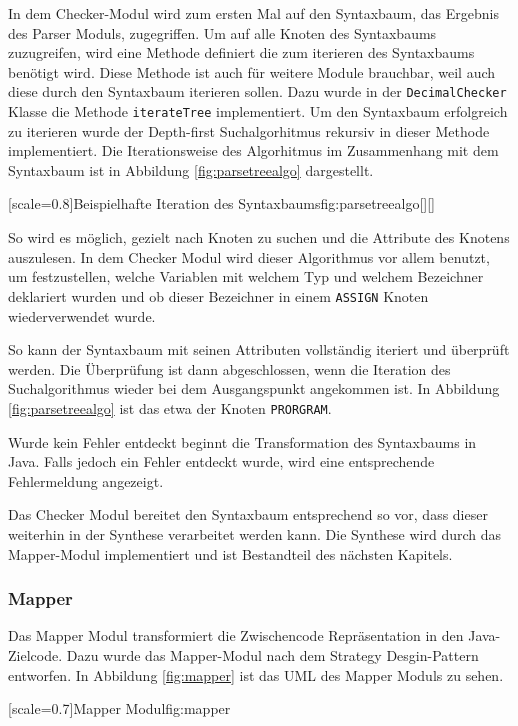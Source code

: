In dem Checker-Modul wird zum ersten Mal auf den Syntaxbaum, das Ergebnis des Parser Moduls, zugegriffen.
Um auf alle Knoten des Syntaxbaums zuzugreifen, wird eine Methode definiert die zum iterieren des Syntaxbaums benötigt wird.
Diese Methode ist auch für weitere Module brauchbar, weil auch diese durch den Syntaxbaum iterieren sollen.
Dazu wurde in der \verb+DecimalChecker+ Klasse die Methode \verb+iterateTree+ implementiert.
Um den Syntaxbaum erfolgreich zu iterieren wurde der Depth-first Suchalgorhitmus rekursiv in dieser Methode implementiert.
Die Iterationsweise des Algorhitmus im Zusammenhang mit dem Syntaxbaum ist in Abbildung \ref{fig:parsetreealgo} dargestellt.

[scale=0.8]{Beispielhafte Iteration des Syntaxbaums}{fig:parsetreealgo}[][]
\pagebreak

So wird es möglich, gezielt nach Knoten zu suchen und die Attribute des Knotens auszulesen.
In dem Checker Modul wird dieser Algorithmus vor allem benutzt, um festzustellen, welche Variablen mit welchem Typ und welchem Bezeichner deklariert wurden und ob dieser Bezeichner in einem \verb+ASSIGN+ Knoten wiederverwendet wurde.

So kann der Syntaxbaum mit seinen Attributen vollständig iteriert und überprüft werden.
Die Überprüfung ist dann abgeschlossen, wenn die Iteration des Suchalgorithmus wieder bei dem Ausgangspunkt angekommen ist. In Abbildung \ref{fig:parsetreealgo} ist das etwa der Knoten \verb+PRORGRAM+.

Wurde kein Fehler entdeckt beginnt die Transformation des Syntaxbaums in Java. Falls jedoch ein Fehler entdeckt wurde, wird eine entsprechende Fehlermeldung angezeigt.

Das Checker Modul bereitet den Syntaxbaum entsprechend so vor, dass dieser weiterhin in der Synthese verarbeitet werden kann.
Die Synthese wird durch das Mapper-Modul implementiert und ist Bestandteil des nächsten Kapitels.
 
 \pagebreak
\subsubsection{Mapper}
Das Mapper Modul transformiert die Zwischencode Repräsentation in den Java-Zielcode. Dazu wurde das Mapper-Modul nach dem Strategy Desgin-Pattern entworfen.
In Abbildung \ref{fig:mapper} ist das UML des Mapper Moduls zu sehen. 


[scale=0.7]{Mapper Modul}{fig:mapper}
\pagebreak

